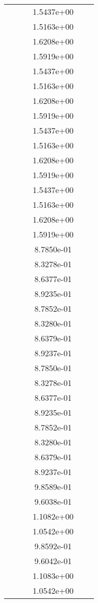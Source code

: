 \begin{xltabular}{\textwidth}{r|rS[table-format=1.3e+2]S[table-format=1.4e+2]S[table-format=1.4e+2]S[table-format=-1.5]}
&  &  & 1.5437e+00 & & \\
&  &  & 1.5163e+00 & & \\
&  &  & 1.6208e+00 & & \\
&  &  & 1.5919e+00 & & \\
&  &  & 1.5437e+00 & & \\
&  &  & 1.5163e+00 & & \\
&  &  & 1.6208e+00 & & \\
&  &  & 1.5919e+00 & & \\
&  &  & 1.5437e+00 & & \\
&  &  & 1.5163e+00 & & \\
&  &  & 1.6208e+00 & & \\
&  &  & 1.5919e+00 & & \\
&  &  & 1.5437e+00 & & \\
&  &  & 1.5163e+00 & & \\
&  &  & 1.6208e+00 & & \\
&  &  & 1.5919e+00 & & \\
&  &  & 8.7850e-01 & & \\
&  &  & 8.3278e-01 & & \\
&  &  & 8.6377e-01 & & \\
&  &  & 8.9235e-01 & & \\
&  &  & 8.7852e-01 & & \\
&  &  & 8.3280e-01 & & \\
&  &  & 8.6379e-01 & & \\
&  &  & 8.9237e-01 & & \\
&  &  & 8.7850e-01 & & \\
&  &  & 8.3278e-01 & & \\
&  &  & 8.6377e-01 & & \\
&  &  & 8.9235e-01 & & \\
&  &  & 8.7852e-01 & & \\
&  &  & 8.3280e-01 & & \\
&  &  & 8.6379e-01 & & \\
&  &  & 8.9237e-01 & & \\
&  &  & 9.8589e-01 & & \\
&  &  & 9.6038e-01 & & \\
&  &  & 1.1082e+00 & & \\
&  &  & 1.0542e+00 & & \\
&  &  & 9.8592e-01 & & \\
&  &  & 9.6042e-01 & & \\
&  &  & 1.1083e+00 & & \\
&  &  & 1.0542e+00 & & \\

\end{xltabular}
